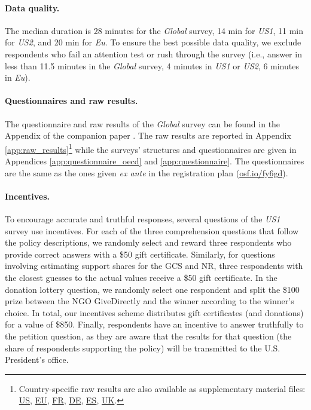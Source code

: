 \begin{small}
\paragraph{\small Data quality.} %
The median duration is 28 minutes for the \textit{Global} survey, 14 min for \textit{US1}, 11 min for \textit{US2}, and 20 min for \textit{Eu}. To ensure the best possible data quality, we exclude respondents who fail an attention test or rush through the survey (i.e., answer in less than 11.5 minutes in the \textit{Global} survey, 4 minutes in \textit{US1} or \textit{US2}, 6 minutes in \textit{Eu}). %

\paragraph{\small Questionnaires and raw results.} %
The questionnaire and raw results of the \textit{Global} survey can be found in the Appendix of the companion paper \citep{dechezlepretre_fighting_2022}. %
The raw results are reported in Appendix \ref{app:raw_results}\footnote{Country-specific raw results are also available as supplementary material files:  \href{https://github.com/bixiou/international_attitudes_toward_global_policies/raw/main/paper/app_desc_stats_US.pdf}{US}, \href{https://github.com/bixiou/international_attitudes_toward_global_policies/raw/main/paper/app_desc_stats_EU.pdf}{EU}, \href{https://github.com/bixiou/international_attitudes_toward_global_policies/raw/main/paper/app_desc_stats_FR.pdf}{FR}, \href{https://github.com/bixiou/international_attitudes_toward_global_policies/raw/main/paper/app_desc_stats_DE.pdf}{DE}, \href{https://github.com/bixiou/international_attitudes_toward_global_policies/raw/main/paper/app_desc_stats_ES.pdf}{ES}, \href{https://github.com/bixiou/international_attitudes_toward_global_policies/raw/main/paper/app_desc_stats_UK.pdf}{UK}.} while the surveys' structures and questionnaires are given in Appendices \ref{app:questionnaire_oecd} and \ref{app:questionnaire}. The questionnaires are the same as the ones given \textit{ex ante} in the registration plan (\href{https://osf.io/fy6gd}{osf.io/fy6gd}).
\paragraph{\small Incentives.} %
To encourage accurate and truthful responses, several questions of the \textit{US1} survey use incentives. For each of the three comprehension questions that follow the policy descriptions, we randomly select and reward three respondents who provide correct answers with a \$50 gift certificate. Similarly, for questions involving estimating support shares for the GCS and NR, three respondents with the closest guesses to the actual values receive a \$50 gift certificate. In the donation lottery question, we randomly select one respondent and split the \$100 prize between the NGO GiveDirectly and the winner according to the winner's choice. In total, our incentives scheme distributes gift certificates (and donations) for a value of \$850. Finally, respondents have an incentive to answer truthfully to the petition question, as they are aware that the results for that question (the share of respondents supporting the policy) will be transmitted to the U.S. President's office.

\end{small}
